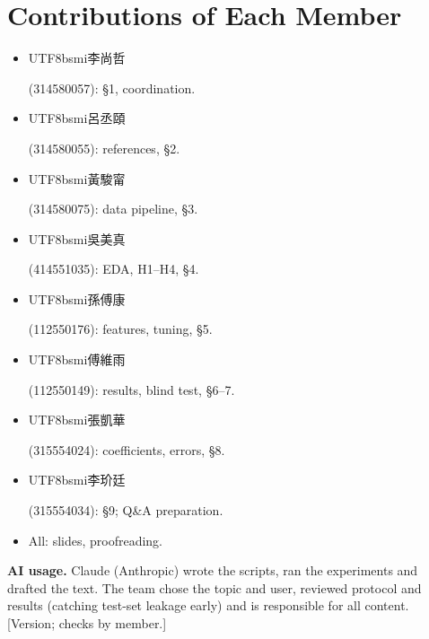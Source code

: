 \documentclass[11pt]{article}
\newcommand{\zh}[1]{\begin{CJK}{UTF8}{bsmi}#1\end{CJK}}
\begin{document}
\section*{Contributions of Each Member}
\begin{itemize}
\item \zh{李尚哲} (314580057): \S1, coordination.
\item \zh{呂丞頤} (314580055): references, \S2.
\item \zh{黃駿甯} (314580075): data pipeline, \S3.
\item \zh{吳美真} (414551035): EDA, H1--H4, \S4.
\item \zh{孫傅康} (112550176): features, tuning, \S5.
\item \zh{傅維雨} (112550149): results, blind test, \S6--7.
\item \zh{張凱華} (315554024): coefficients, errors, \S8.
\item \zh{李玠廷} (315554034): \S9; Q\&A preparation.
\item All: slides, proofreading.
\end{itemize}

\noindent\textbf{AI usage.} Claude (Anthropic) wrote the scripts, ran the experiments and drafted the text. The team chose the topic and user, reviewed protocol and results (catching test-set leakage early) and is responsible for all content. [Version; checks by member.]


\end{document}
